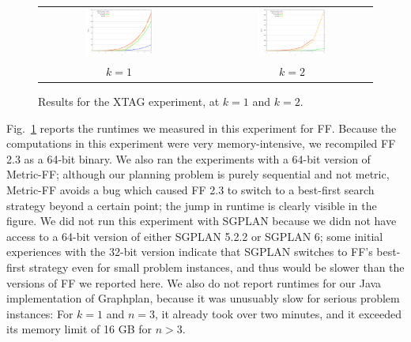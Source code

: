 \begin{figure}[h]
  \begin{tabular}{cp{1cm}c}
    \includegraphics[width=0.45\textwidth]{data/xtag-k1.pdf}
    &&
    \includegraphics[width=0.45\textwidth]{data/xtag-k2.pdf} \\
    $k=1$ && $k=2$ \\
  \end{tabular} 
  \caption{Results for the XTAG experiment, at $k=1$ and $k=2$.}
  \label{fig:xtag-graph}
\end{figure}

Fig.~\ref{fig:xtag-graph} reports the runtimes we measured in this
experiment for FF. Because the computations in this experiment were
very memory-intensive, we recompiled FF 2.3 as a 64-bit binary. We
also ran the experiments with a 64-bit version of Metric-FF; although
our planning problem is purely sequential and not metric, Metric-FF
avoids a bug which caused FF 2.3 to switch to a best-first search
strategy beyond a certain point; the jump in runtime is clearly
visible in the figure. We did not run this experiment with SGPLAN
because we didn not have access to a 64-bit version of either SGPLAN
5.2.2 or SGPLAN 6; some initial experiences with the 32-bit version
indicate that SGPLAN switches to FF's best-first strategy even for
small problem instances, and thus would be slower than the versions of
FF we reported here. We also do not report runtimes for our Java
implementation of Graphplan, because it was unusuably slow for serious
problem instances: For $k=1$ and $n=3$, it already took over two
minutes, and it exceeded its memory limit of 16 GB for
$n>3$. 

